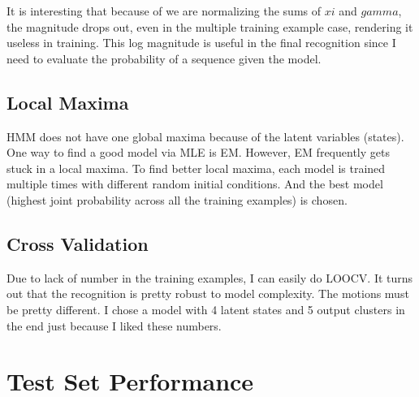 \documentclass[english]{article}
\begin{document}
It is interesting that because of we are normalizing the sums of $xi$ and $gamma$, the magnitude drops out, even in the multiple training example case, rendering it useless in training. This log magnitude is useful in the final recognition since I need to evaluate the probability of a sequence given the model.
\subsection{Local Maxima}
HMM does not have one global maxima because of the latent variables (states). One way to find a good model via MLE is EM. However, EM frequently gets stuck in a local maxima. To find better local maxima, each model is trained multiple times with different random initial conditions. And the best model (highest joint probability across all the training examples) is chosen.
\subsection{Cross Validation}
Due to lack of number in the training examples, I can easily do LOOCV. It turns out that the recognition is pretty robust to model complexity. The motions must be pretty different. I chose a model with 4 latent states and 5 output clusters in the end just because I liked these numbers.
\section*{Test Set Performance}
\end{document}
